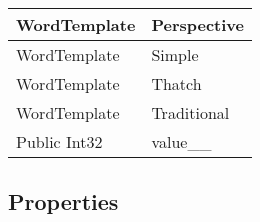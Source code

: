 \documentclass[11pt, oneside, a4paper]{book}
\begin{document}
\begin{center}
\begin{tabular}{| p{3cm} | p{12cm} | }
\hline
 WordTemplate &  Perspective\hypertarget{SoftwareEngineeringTools.{}Documentation.{}WordGenerator+WordTemplate.{}Perspective}{}\\
\hline
 WordTemplate &  Simple\hypertarget{SoftwareEngineeringTools.{}Documentation.{}WordGenerator+WordTemplate.{}Simple}{}\\
\hline
 WordTemplate &  Thatch\hypertarget{SoftwareEngineeringTools.{}Documentation.{}WordGenerator+WordTemplate.{}Thatch}{}\\
\hline
 WordTemplate &  Traditional\hypertarget{SoftwareEngineeringTools.{}Documentation.{}WordGenerator+WordTemplate.{}Traditional}{}\\
\hline
 Public  Int32 &  value\_\_\hypertarget{SoftwareEngineeringTools.{}Documentation.{}WordGenerator+WordTemplate.{}value\_\_}{}\\
\hline
\end{tabular}
\end{center}

\subsection{Properties}
\end{document}
